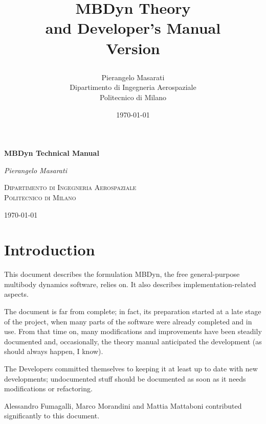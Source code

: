 \documentclass[10pt,dvips,fleqn,subeqn]{report}
\begin{document}
\begin{latexonly}
\title{\bf MBDyn Theory \\ and Developer's Manual \\
Version

}
\author{Pierangelo Masarati \vspace{5mm}\\
    \sc Dipartimento di Ingegneria Aerospaziale \\
    \sc Politecnico di Milano}
\date{\today}
\maketitle
\end{latexonly}

\begin{htmlonly}
\begin{center}
\textbf{\LARGE MBDyn Technical Manual}

\emph{\large Pierangelo Masarati}

\textsc{Dipartimento di Ingegneria Aerospaziale \\ Politecnico di Milano}

\today
\end{center}
\end{htmlonly}




\tableofcontents
\newpage
\listoffigures
\newpage
\listoftables
\newpage



\chapter{Introduction}
This document describes the formulation MBDyn,
the free general-purpose multibody dynamics software,
relies on.
It also describes implementation-related aspects.

The document is far from complete; in fact, its preparation
started at a late stage of the project, when many parts
of the software were already completed and in use.
From that time on, many modifications and improvements
have been steadily documented and, occasionally,
the theory manual anticipated the development
(as should always happen, I know).

The Developers committed themselves to keeping it at least up to date
with new developments; undocumented stuff should be documented
as soon as it needs modifications or refactoring.

Alessandro Fumagalli, Marco Morandini and Mattia Mattaboni
contributed significantly to this document.
\end{document}
